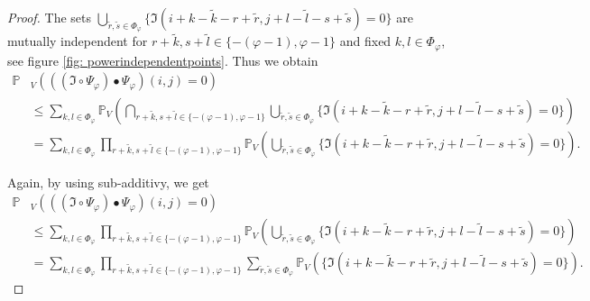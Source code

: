 \documentclass[a4paper,12pt]{article}
\theoremstyle{plain}
\theoremstyle{definition}
\begin{document}
\begin{appendix}
\begin{proof}
		The sets $\bigcup_{\tilde{r}, \tilde{s} \in \Phi_\varphi} \{ \mathfrak{I}(i + k - \tilde{k} - r + \tilde{r}, j + l - \tilde{l} - s + \tilde{s}) = 0 \}$ are mutually independent for $r + \tilde{k}, s + \tilde{l} \in \{ - ( \varphi - 1 ), \varphi - 1 \}$ and fixed $k, l \in \Phi_\varphi$, see figure \ref{fig: powerindependentpoints}. Thus we obtain
		\begin{align*}
			\mathbb{P}&_V\left( ((\mathfrak{I} \circ \Psi_\varphi) \bullet \Psi_\varphi)(i, j) = 0 \right) \\
			&\leq \sum_{k, l \in \Phi_\varphi} \mathbb{P}_V\left( \bigcap_{r + \tilde{k}, s + \tilde{l} \in \{ - ( \varphi - 1 ), \varphi - 1 \}} \bigcup_{\tilde{r}, \tilde{s} \in \Phi_\varphi} \{ \mathfrak{I}(i + k - \tilde{k} - r + \tilde{r}, j + l - \tilde{l} - s + \tilde{s}) = 0 \} \right) \\
			&= \sum_{k, l \in \Phi_\varphi} \prod_{r + \tilde{k}, s + \tilde{l} \in \{ - ( \varphi - 1 ), \varphi - 1 \}} \mathbb{P}_V\left( \bigcup_{\tilde{r}, \tilde{s} \in \Phi_\varphi} \{ \mathfrak{I}(i + k - \tilde{k} - r + \tilde{r}, j + l - \tilde{l} - s + \tilde{s}) = 0 \} \right).
		\end{align*}
		
		Again, by using sub-additivy, we get
		\begin{align*}
			\mathbb{P}&_V\left( ((\mathfrak{I} \circ \Psi_\varphi) \bullet \Psi_\varphi)(i, j) = 0 \right) \\
			&\leq \sum_{k, l \in \Phi_\varphi} \prod_{r + \tilde{k}, s + \tilde{l} \in \{ - ( \varphi - 1 ), \varphi - 1 \}} \mathbb{P}_V\left( \bigcup_{\tilde{r}, \tilde{s} \in \Phi_\varphi} \{ \mathfrak{I}(i + k - \tilde{k} - r + \tilde{r}, j + l - \tilde{l} - s + \tilde{s}) = 0 \} \right) \\
			&= \sum_{k, l \in \Phi_\varphi} \prod_{r + \tilde{k}, s + \tilde{l} \in \{ - ( \varphi - 1 ), \varphi - 1 \}} \sum_{\tilde{r}, \tilde{s} \in \Phi_\varphi} \mathbb{P}_V\left( \{ \mathfrak{I}(i + k - \tilde{k} - r + \tilde{r}, j + l - \tilde{l} - s + \tilde{s}) = 0 \} \right).
		\end{align*}
		

\end{proof}
\end{appendix}
\end{document}
